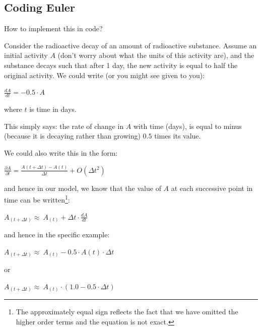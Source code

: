 \documentclass{tufte-book} %
\begin{document}

\subsection*{Coding Euler}

How to implement this in code?

Consider the radioactive decay of an amount of radioactive substance. Assume an initial activity \(A\) (don't worry about what the units of this activity are), and the substance decays such that after 1 day, the new activity is equal to half the original activity. We could write (or you might see given to you):

\vspace{2mm}
\(\frac{dA}{dt}=-0.5\cdot A\)
\vspace{2mm}

\noindent where \(t\) is time in days. 

This simply says: the rate of change in \(A\) with time (days), is equal to minus (because it is decaying rather than growing) \(0.5\) times its value.

We could also write this in the form:

\vspace{2mm}\(
\frac{\partial A}{\partial t} = \frac{A(t+\Delta t)-A(t)}{\Delta t} + O(\Delta t^{2})
\)\vspace{2mm}

\noindent and hence in our model, we know that the value of \(A\) at each successive point in time can be written\footnote{The approximately equal sign reflects the fact that we have omitted the higher order terms and the equation is not exact.}:

\vspace{2mm}\(
A_{(t+\Delta t)} \approx\ A_{(t)} + \Delta t\cdot\frac{dA}{dt}
\)\vspace{2mm}

\noindent and hence in the specific example:

\vspace{2mm}\(
A_{(t+\Delta t)} \approx\ A_{(t)} -0.5\cdot A(t) \cdot \Delta t
\)\vspace{2mm}

\noindent or

\vspace{2mm}\(
A_{(t+\Delta t)} \approx\ A_{(t)}\cdot(1.0-0.5\cdot \Delta t)
\)\vspace{2mm}
\end{document}
